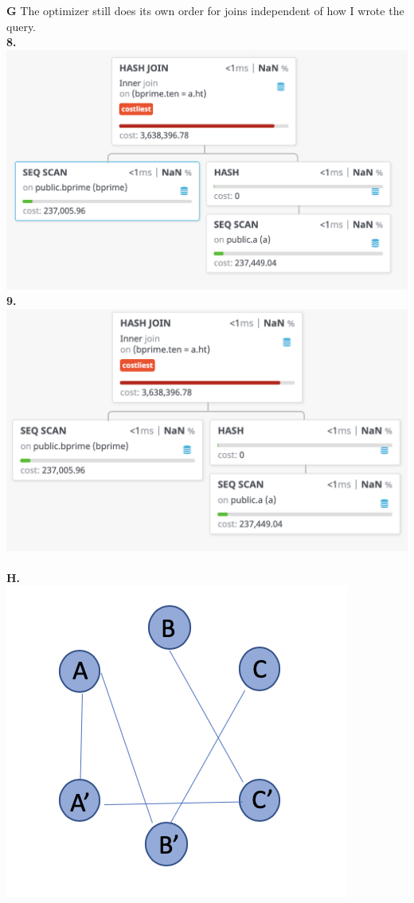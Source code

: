 \documentclass[12pt, letterpaper, fleqn]{article}
\begin{document}
  \textbf{G} The optimizer still does its own order for joins independent of how
  I wrote the query.\\
  \textbf{8. }\\
  \includegraphics[scale=0.5]{query_pics/8.png} \\
  \textbf{9. }\\
  \includegraphics[scale=0.5]{query_pics/9.png} \\\\

  \textbf{H. }\\
  \includegraphics[scale=0.4]{query_pics/23query.png} \\
\end{document}
